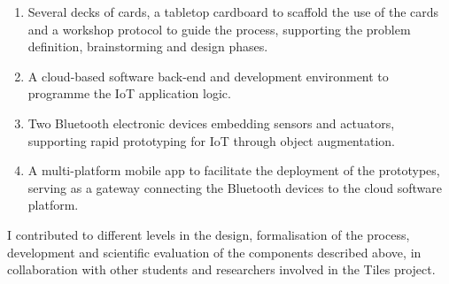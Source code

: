 \begin{enumerate}
    \item Several decks of cards, a tabletop cardboard to scaffold the use of the cards and a workshop protocol to guide the process, supporting the problem definition, brainstorming and design phases.
    \item A cloud-based software back-end and development environment to programme the IoT application logic.
    \item Two Bluetooth electronic devices embedding sensors and actuators, supporting rapid prototyping for IoT through object augmentation.
    \item A multi-platform mobile app to facilitate the deployment of the prototypes, serving as a gateway connecting the Bluetooth devices to the cloud software platform.
\end{enumerate}

I contributed to different levels in the design, formalisation of the process, development and scientific evaluation of the components described above, in collaboration with other students and researchers involved in the Tiles project.


